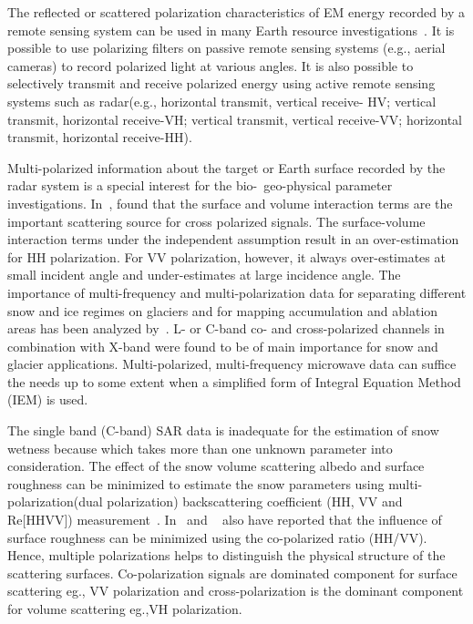 \begin{description}
	The reflected or scattered polarization characteristics of EM energy recorded by a remote sensing system can be used in many Earth resource investigations~\citep{Jensen2005introductory}. It is possible to use polarizing filters on passive remote sensing systems (e.g., aerial cameras) to record polarized light at various angles. It is also possible to selectively transmit and receive polarized energy using active remote sensing systems such as radar(e.g., horizontal transmit, vertical receive- HV; vertical transmit, horizontal receive-VH; vertical transmit, vertical receive-VV; horizontal transmit, horizontal receive-HH).
	
	Multi-polarized information about the target or Earth surface recorded by the radar system is a special interest for the bio-\ geo-physical parameter investigations. In~\citep{shi1995sir}, found that the surface and volume interaction terms are the important scattering source for cross polarized signals. The surface-volume interaction terms under the independent assumption result in an over-estimation for HH polarization. For VV polarization, however, it always over-estimates at small incident angle and under-estimates at large incidence angle. The importance of multi-frequency and multi-polarization data for separating different snow and ice regimes on glaciers and for mapping accumulation and ablation areas has been analyzed by~\citep{rott1995snow}. L- or C-band co- and cross-polarized channels in combination with X-band were found to be of main importance for snow and glacier applications. Multi-polarized, multi-frequency microwave data can suffice the needs up to some extent when a simplified form of Integral Equation Method (IEM) is used. 
	
	The single band (C-band) SAR data is inadequate for the estimation of snow wetness because which takes more than one unknown parameter into consideration. The effect of the snow volume scattering albedo and surface roughness can be minimized to estimate the snow parameters using multi-polarization(dual polarization) backscattering coefficient (HH, VV and Re{[\mbox{HHVV}]}) measurement~\citep{Shi95wetness}. In~\citep{autret1989theoretical} and ~\citep{chen1995simple} also have reported that the influence of surface roughness can be minimized using the co-polarized ratio (HH/VV). Hence, multiple polarizations helps to distinguish the physical structure of the scattering surfaces. Co-polarization signals are dominated component for surface scattering eg., $\mbox{VV}$ polarization and cross-polarization is the dominant component for volume scattering eg.,$\mbox{VH}$ polarization.
	

\end{description}
